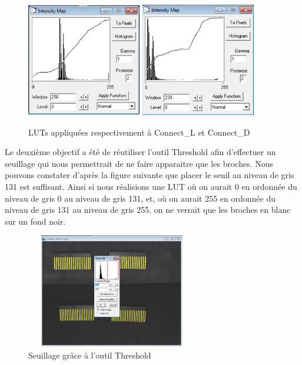 \documentclass{scrreprt}
\begin{document}
\begin{figure}[H]
\centering
\includegraphics[height=5cm,width=5cm]{images/lut1.png} \hfill
\includegraphics[height=5cm,width=5cm]{images/lut2.png}
\caption{LUTs appliquées respectivement à Connect_L et Connect_D}
\end{figure}

Le deuxième objectif a été de réutiliser l'outil Threshold afin d'effectuer un seuillage
qui nous permettrait de ne faire apparaitre que les broches. Nous pouvons constater d'après la figure
suivante que placer le seuil au niveau de gris 131 est suffisant. Ainsi si nous réalisions une LUT
où on aurait 0 en ordonnée du niveau de gris 0 au niveau de gris 131, et, où on aurait 255 en 
ordonnée du niveau de gris 131 au niveau de gris 255, on ne verrait que les broches en blanc sur
un fond noir.  

\begin{figure}[H]
\centering
\includegraphics[height=5cm,width=7.5cm]{images/threshold1.png}
\caption{Seuillage grâce à l'outil Threshold}
\end{figure}
\end{document}
